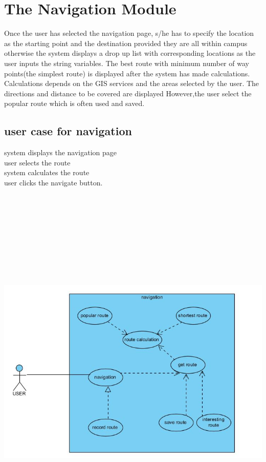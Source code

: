 \documentclass[10pt]{article}
\begin{document}
 \section{The Navigation Module}
 Once the user has selected the navigation page, s/he has to specify the location as the starting point and the destination provided they are all within campus otherwise the system displays a drop up list with corresponding locations as the user inputs the string variables. The best route with minimum number of way points(the simplest route) is displayed after the system has made calculations. Calculations depends on the GIS services and the areas selected by the user. The directions and distance to be covered are displayed However,the user select the popular route which is often used and saved.      
\subsection{user case for navigation }
system displays the navigation page\\
user selects the route\\
system calculates the route\\
user clicks the navigate button.
\subsubsection{}
 
\includegraphics[width=8in, height=7in]{NUCD.JPG} 
\end{document}
